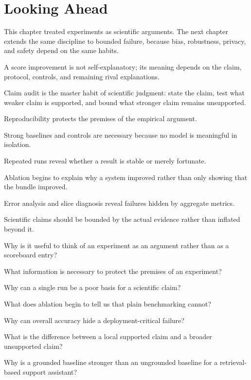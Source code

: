 \section{Looking Ahead}

This chapter treated experiments as scientific arguments. The next chapter extends the same discipline to bounded failure, because bias, robustness, privacy, and safety depend on the same habits.

\begin{chaptersummary}
\item A score improvement is not self-explanatory; its meaning depends on the claim, protocol, controls, and remaining rival explanations.
\item Claim audit is the master habit of scientific judgment: state the claim, test what weaker claim is supported, and bound what stronger claim remains unsupported.
\item Reproducibility protects the premises of the empirical argument.
\item Strong baselines and controls are necessary because no model is meaningful in isolation.
\item Repeated runs reveal whether a result is stable or merely fortunate.
\item Ablation begins to explain why a system improved rather than only showing that the bundle improved.
\item Error analysis and slice diagnosis reveal failures hidden by aggregate metrics.
\item Scientific claims should be bounded by the actual evidence rather than inflated beyond it.
\end{chaptersummary}

\begin{studyquestions}
\item Why is it useful to think of an experiment as an argument rather than as a scoreboard entry?
\item What information is necessary to protect the premises of an experiment?
\item Why can a single run be a poor basis for a scientific claim?
\item What does ablation begin to tell us that plain benchmarking cannot?
\item Why can overall accuracy hide a deployment-critical failure?
\item What is the difference between a local supported claim and a broader unsupported claim?
\item Why is a grounded baseline stronger than an ungrounded baseline for a retrieval-based support assistant?
\end{studyquestions}

